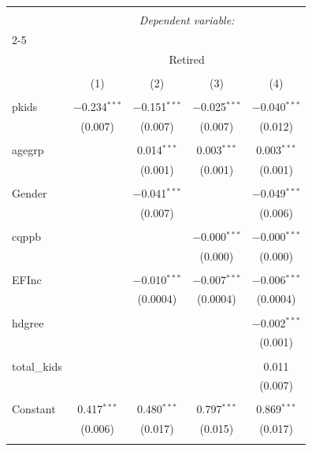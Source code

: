 
\begingroup 
\small 
\begin{tabular}{@{\extracolsep{2pt}}lcccc} 
\\[-1.8ex]\hline 
\hline \\[-1.8ex] 
 & \multicolumn{4}{c}{\textit{Dependent variable:}} \\ 
\cline{2-5} 
\\[-1.8ex] & \multicolumn{4}{c}{Retired} \\ 
\\[-1.8ex] & (1) & (2) & (3) & (4)\\ 
\hline \\[-1.8ex] 
 pkids & $-$0.234$^{***}$ & $-$0.151$^{***}$ & $-$0.025$^{***}$ & $-$0.040$^{***}$ \\ 
  & (0.007) & (0.007) & (0.007) & (0.012) \\ 
  & & & & \\ 
 agegrp &  & 0.014$^{***}$ & 0.003$^{***}$ & 0.003$^{***}$ \\ 
  &  & (0.001) & (0.001) & (0.001) \\ 
  & & & & \\ 
 Gender &  & $-$0.041$^{***}$ &  & $-$0.049$^{***}$ \\ 
  &  & (0.007) &  & (0.006) \\ 
  & & & & \\ 
 cqppb &  &  & $-$0.000$^{***}$ & $-$0.000$^{***}$ \\ 
  &  &  & (0.000) & (0.000) \\ 
  & & & & \\ 
 EFInc &  & $-$0.010$^{***}$ & $-$0.007$^{***}$ & $-$0.006$^{***}$ \\ 
  &  & (0.0004) & (0.0004) & (0.0004) \\ 
  & & & & \\ 
 hdgree &  &  &  & $-$0.002$^{***}$ \\ 
  &  &  &  & (0.001) \\ 
  & & & & \\ 
 total\_kids &  &  &  & 0.011 \\ 
  &  &  &  & (0.007) \\ 
  & & & & \\ 
 Constant & 0.417$^{***}$ & 0.480$^{***}$ & 0.797$^{***}$ & 0.869$^{***}$ \\ 
  & (0.006) & (0.017) & (0.015) & (0.017) \\ 
  & & & & \\ 

\end{tabular}
